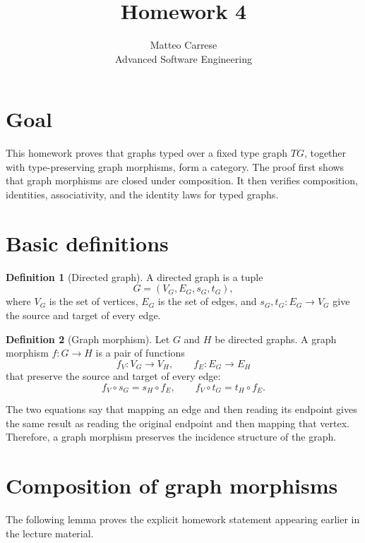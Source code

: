 \documentclass[10pt,a4paper]{article}
\title{\textcolor{heading}{\textbf{Homework 4}}}
\author{Matteo Carrese\\Advanced Software Engineering}
\date{}
\theoremstyle{definition}
\newtheorem{definition}{Definition}
\newcommand{\TG}{\mathit{TG}}
\begin{document}
\maketitle

\section{Goal}

This homework proves that graphs typed over a fixed type graph $\TG$, together
with type-preserving graph morphisms, form a category. The proof first shows
that graph morphisms are closed under composition. It then verifies
composition, identities, associativity, and the identity laws for typed graphs.


\section{Basic definitions}

\begin{definition}[Directed graph]
A directed graph is a tuple
\[
    G=(V_G,E_G,s_G,t_G),
\]
where $V_G$ is the set of vertices, $E_G$ is the set of edges, and
$s_G,t_G:E_G\to V_G$ give the source and target of every edge.
\end{definition}

\begin{definition}[Graph morphism]
Let $G$ and $H$ be directed graphs. A graph morphism $f:G\to H$ is a pair
of functions
\[
    f_V:V_G\to V_H,
    \qquad
    f_E:E_G\to E_H
\]
that preserve the source and target of every edge:
\begin{equation}
    f_V\circ s_G=s_H\circ f_E,
    \qquad
    f_V\circ t_G=t_H\circ f_E.
    \label{eq:graph-morphism}
\end{equation}
\end{definition}

The two equations say that mapping an edge and then reading its endpoint gives
the same result as reading the original endpoint and then mapping that vertex.
Therefore, a graph morphism preserves the incidence structure of the graph.

\section{Composition of graph morphisms}

The following lemma proves the explicit homework statement appearing earlier
in the lecture material.
\end{document}
